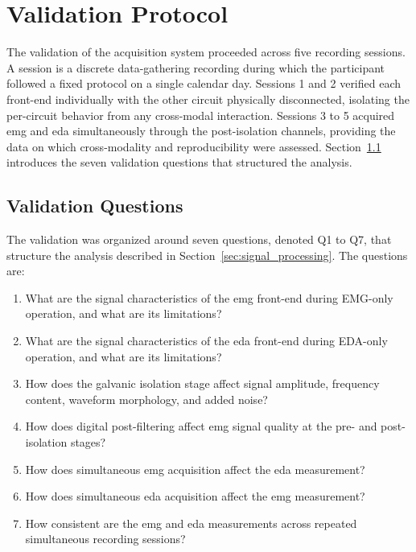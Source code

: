 \FloatBarrier

\section{Validation Protocol}
\label{sec:validation}

The validation of the acquisition system proceeded across five recording sessions. A session is a discrete data-gathering recording during which the participant followed a fixed protocol on a single calendar day. Sessions 1 and 2 verified each front-end individually with the other circuit physically disconnected, isolating the per-circuit behavior from any cross-modal interaction. Sessions 3 to 5 acquired \gls{emg} and \gls{eda} simultaneously through the post-isolation channels, providing the data on which cross-modality and reproducibility were assessed. Section~\ref{sec:validation_Q} introduces the seven validation questions that structured the analysis.

\subsection{Validation Questions}
\label{sec:validation_Q}
The validation was organized around seven questions, denoted Q1 to Q7, that structure the analysis described in Section~\ref{sec:signal_processing}. The questions are:

\begin{enumerate}[label=\textbf{Q\arabic*}]
    \item What are the signal characteristics of the \gls{emg} front-end during EMG-only operation, and what are its limitations?
    \item What are the signal characteristics of the \gls{eda} front-end during EDA-only operation, and what are its limitations?
    \item How does the galvanic isolation stage affect signal amplitude, frequency content, waveform morphology, and added noise?
    \item How does digital post-filtering affect \gls{emg} signal quality at the pre- and post-isolation stages?
    \item How does simultaneous \gls{emg} acquisition affect the \gls{eda} measurement?
    \item How does simultaneous \gls{eda} acquisition affect the \gls{emg} measurement?
    \item How consistent are the \gls{emg} and \gls{eda} measurements across repeated simultaneous recording sessions?
\end{enumerate}

